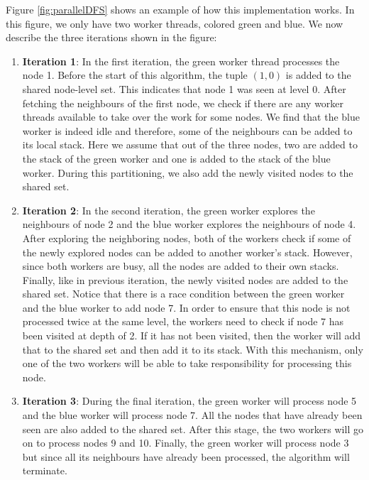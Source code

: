 Figure \ref{fig:parallelDFS} shows an example of how this implementation works.
In this figure, we only have
two worker threads, colored green and blue. We now describe the three iterations
shown in the figure:
\begin{enumerate}
    \item \textbf{Iteration 1}: In the first iteration, the green worker thread
        processes the node 1. Before the start of this
        algorithm, the tuple $(1,0)$ is added to the shared node-level
        set. This indicates that node 1 was seen at level 0. After
        fetching the neighbours of the first node, we check if there are any
        worker threads available to take over the work for some nodes. We find
        that the blue worker is indeed idle and therefore, some of the
        neighbours can be added to its local stack. Here we assume that out of
        the three nodes, two are added to the stack of the green worker and one
        is added to the stack of the blue worker. During this partitioning, we
        also add the newly visited nodes to the shared set. 
    \item \textbf{Iteration 2}: In the second iteration, the green worker
        explores the neighbours of node 2 and the blue worker
        explores the neighbours of node 4. After exploring the
        neighboring nodes, both of the workers check if some of the newly
        explored nodes can be added to another worker's stack. However, since
        both workers are busy, all the nodes are added to their own stacks.
        Finally, like in previous iteration, the newly visited nodes are added
        to the shared set. Notice that there is a race condition between the
        green worker and the blue worker to add node 7. In order to ensure that
        this node is not processed twice at the same level, the workers need to
        check if node 7 has been visited at depth of 2. If it has not been
        visited, then the worker will add that to the shared set and then add it
        to its stack. With this mechanism, only one of the two workers will be
        able to take responsibility for processing this node.
    \item \textbf{Iteration 3}: During the final iteration, the green worker
        will process node 5 and the blue worker will process node 7. All the
        nodes that have already been seen are also added to the shared set.
        After this stage, the two workers will go on to process nodes 9 and 10.
        Finally, the green worker will process node 3 but since all its
        neighbours have already been processed, the algorithm will terminate.
\end{enumerate}
